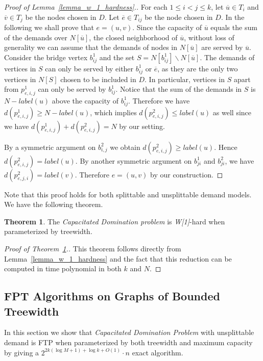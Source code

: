 \documentclass[a4paper,11pt]{article}
\theoremstyle{definition}
\newtheorem{theorem}{Theorem}
\begin{document}
\begin{proof}[Proof of Lemma~\ref{lemma_w_1_hardness}.]
For each $1\le i<j \le k$, let $\overline{u} \in T_i$ and $\overline{v} \in T_j$ be the nodes chosen in $D$. Let $\overline{e} \in T_{ij}$ be the node chosen in $D$. In the following we shall prove that $e = (u,v)$. Since the capacity of $\overline{u}$ equals the sum of the demands over $N[\overline{u}]$, the closed neighborhood of $\overline{u}$, without loss of generality we can assume that the demands of nodes in $N[\overline{u}]$ are served by $\overline{u}$. Consider the bridge vertex $b^1_{ij}$ and the set $S = N[b^1_{ij}] \backslash N[\overline{u}]$. The demands of vertices in $S$ can only be served by either $b^1_{ij}$ or $\overline{e}$, as they are the only two vertices in $N[S]$ chosen to be included in $D$. In particular, vertices in $S$ apart from $p^1_{e,i,j}$ can only be served by $b^1_{ij}$. Notice that the sum of the demands in $S$ is $N-label(u)$ above the capacity of $b^1_{ij}$. Therefore we have $d(p^1_{e,i,j}) \ge N-label(u)$, which implies $d(p^2_{e,i,j}) \le label(u)$ as well since we have $d(p^1_{e,i,j})+d(p^2_{e,i,j})=N$ by our setting.

By a symmetric argument on $b^2_{i,j}$ we obtain $d(p^2_{e,i,j}) \ge label(u)$. Hence $d(p^2_{e,i,j}) = label(u)$. By another symmetric argument on $b^1_{ji}$ and $b^2_{ji}$, we have $d(p^2_{e,j,i}) = label(v)$. Therefore $e = (u,v)$ by our construction.
\end{proof}

Note that this proof holds for both splittable and unsplittable demand models. We have the following theorem.

\begin{theorem} \label{theorem_w_1_hardness}
The {\em Capacitated Domination problem} is {\it W[1]}-hard when parameterized by treewidth.
\end{theorem}

\begin{proof}[Proof of Theorem~\ref{theorem_w_1_hardness}.]
This theorem follows directly from Lemma~\ref{lemma_w_1_hardness} and the fact that this reduction can be computed in time polynomial in both $k$ and $N$.
\end{proof}




\subsection{FPT Algorithms on Graphs of Bounded Treewidth}

In this section we show that {\em Capacitated Domination Problem} with unsplittable demand is FTP when parameterized by both treewidth and maximum capacity by giving a $2^{2k(\log M+1)+\log k+O(1)}\cdot n$ exact algorithm.
\end{document}
